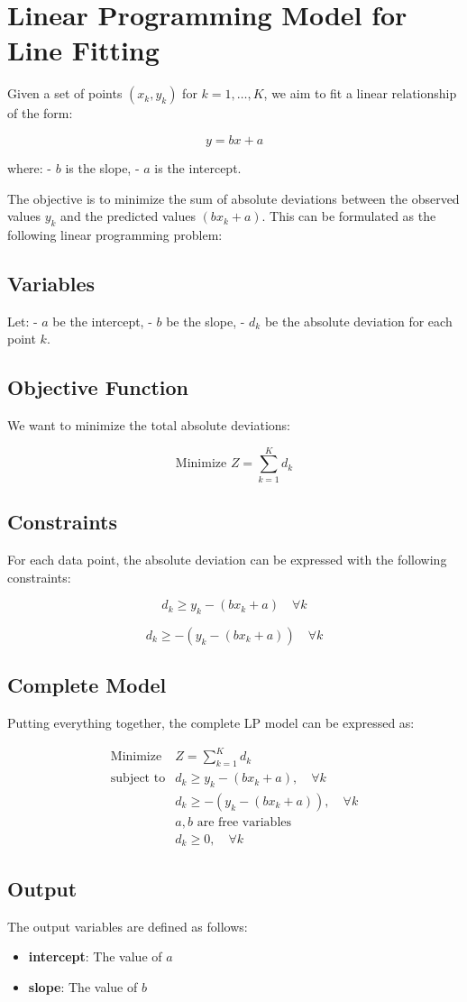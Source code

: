 \documentclass{article}
\begin{document}
\section*{Linear Programming Model for Line Fitting}

Given a set of points \((x_k, y_k)\) for \(k = 1, \ldots, K\), we aim to fit a linear relationship of the form:

\[
y = bx + a
\]

where:
- \(b\) is the slope,
- \(a\) is the intercept.

The objective is to minimize the sum of absolute deviations between the observed values \(y_k\) and the predicted values \((bx_k + a)\). This can be formulated as the following linear programming problem:

\subsection*{Variables}
Let:
- \(a\) be the intercept,
- \(b\) be the slope,
- \(d_k\) be the absolute deviation for each point \(k\).

\subsection*{Objective Function}
We want to minimize the total absolute deviations:

\[
\text{Minimize } Z = \sum_{k=1}^{K} d_k
\]

\subsection*{Constraints}
For each data point, the absolute deviation can be expressed with the following constraints:

\[
d_k \geq y_k - (b x_k + a) \quad \forall k
\]

\[
d_k \geq -(y_k - (b x_k + a)) \quad \forall k
\]

\subsection*{Complete Model}
Putting everything together, the complete LP model can be expressed as:

\[
\begin{array}{rl}
\text{Minimize} & Z = \sum_{k=1}^{K} d_k \\
\text{subject to} & d_k \geq y_k - (b x_k + a), \quad \forall k \\
& d_k \geq -(y_k - (b x_k + a)), \quad \forall k \\
& a, b \text{ are free variables} \\
& d_k \geq 0, \quad \forall k
\end{array}
\]

\subsection*{Output}
The output variables are defined as follows:

\begin{itemize}
    \item \textbf{intercept}: The value of \(a\)
    \item \textbf{slope}: The value of \(b\)
\end{itemize}
\end{document}
